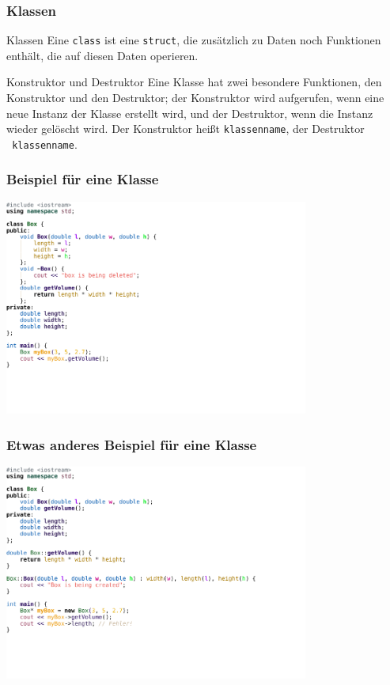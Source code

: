 \documentclass[18pt]{beamer}
\begin{document}
\begin{frame}
    \frametitle{Klassen}
    \begin{block}{Klassen}
    Eine \texttt{class} ist eine \texttt{struct}, die zusätzlich zu Daten noch Funktionen enthält, die auf diesen Daten operieren.
    \end{block}
    \begin{block}{Konstruktor und Destruktor}
    Eine Klasse hat zwei besondere Funktionen, den Konstruktor und den Destruktor; der Konstruktor wird aufgerufen, wenn eine neue Instanz der Klasse erstellt wird, und der Destruktor, wenn die Instanz wieder gelöscht wird. Der Konstruktor heißt \texttt{klassenname}, der Destruktor \texttt{~klassenname}.
    \end{block}
\end{frame}
\begin{frame}
    \frametitle{Beispiel für eine Klasse}
    \vspace{0.7cm}
    \includegraphics[width=10cm]{example_code/box2.pdf}
\end{frame}
\begin{frame}
    \frametitle{Etwas anderes Beispiel für eine Klasse}
    \vspace{0.7cm}
    \includegraphics[width=10cm]{example_code/box3.pdf}
\end{frame}

\end{document}
